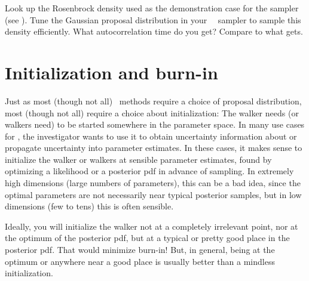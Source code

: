 \documentclass[12pt,twoside,pdftex]{article}
\newcommand{\MCMC}{\acronym{MCMC}}
\newcommand{\MH}{\acronym{M--H}}
\begin{document}
\begin{problem}\label{prob:rosenbrock}
Look up the Rosenbrock density used as the demonstration case for the
 sampler (see \citealt{emcee}).
Tune the Gaussian proposal distribution in your \MH\ \MCMC\ sampler to sample this density efficiently.
What autocorrelation time do you get?
Compare to what  gets.
\end{problem}

\section{Initialization and burn-in}\label{sec:initialization}

Just as most (though not all) \MCMC\ methods require a choice of
proposal distribution, most (though not all) require a choice about
initialization:
The walker needs (or walkers need) to be started somewhere in the
parameter space.
In many use cases for \MCMC, the investigator wants to use it to obtain
uncertainty information about or propagate uncertainty into parameter
estimates.
In these cases, it makes sense to initialize the walker or walkers at
sensible parameter estimates, found by optimizing a likelihood or a
posterior pdf in advance of sampling.
In extremely high dimensions (large numbers of parameters), this can
be a bad idea, since the optimal parameters are not necessarily near
typical posterior samples, but
in low dimensions (few to tens) this is often sensible.

Ideally, you will initialize the walker not at a completely irrelevant
point, nor at the optimum of the posterior pdf, but at a typical or
pretty good place in the posterior pdf.
That would minimize burn-in!
But, in general, being at the optimum or anywhere near a good place is
usually better than a mindless initialization.
\end{document}

